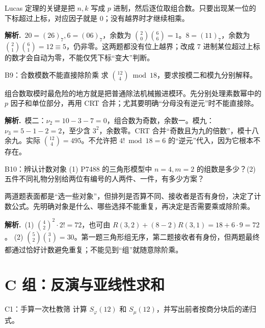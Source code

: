 \documentclass[UTF8,a4paper,11pt,twoside,openright,fontset=fandol]{ctexbook}
\theoremstyle{definition}
\newcommand{\sol}{\par\noindent\textbf{解析.}\ }
\begin{document}
\begin{pitfall}[讲解：先看这题到底在做什么]
Lucas 定理的关键是把 $n,k$ 写成 $p$ 进制，然后逐位取组合数。只要出现某一位的下标超过上标，对应因子就是 $0$；没有越界时才继续相乘。
\end{pitfall}

\sol $20=(26)_7,6=(06)_7$，余数为 $\binom20\binom66=1$。$8=(11)_7$，余数为 $\binom21\binom61=12\equiv5$，仍非零。这两题都没有位上越界；改成 $7$ 进制某位超过上标的数才会自动为零，不能仅凭下标“变大”判断。


\begin{problem}{B9：合数模数不能直接除阶乘}
求 $\binom{12}{4}\bmod18$，要求按模二和模九分别解释。
\end{problem}

\begin{pitfall}[讲解：先看这题到底在做什么]
组合数取模时最危险的地方就是把普通除法机械搬进模环。先分别处理素数幂中的 $p$ 因子和单位部分，再用 CRT 合并；尤其要明确“分母没有逆元”时不能直接除。
\end{pitfall}

\sol 模二：$\nu_2=10-3-7=0$，组合数为奇数，余数一。模九：$\nu_3=5-1-2=2$，至少含 $3^2$，余数零。CRT 合并“奇数且为九的倍数”，模十八余九。实际 $\binom{12}{4}=495$。不允许把 $4!\bmod18=6$ 的“逆元”代入，因为它根本不存在。


\begin{problem}{B10：辨认计数对象}
(1) P7488 的三角形模型中 $n=4,m=2$ 的组数是多少？(2) 五件不同礼物分别给两位有编号的人两件、一件，有多少方案？
\end{problem}

\begin{pitfall}[讲解：先看这题到底在做什么]
两道题表面都是“选一些对象”，但排列是否算不同、接收者是否有身份，决定了计数公式。先明确对象是什么、哪些选择不能重复，再决定是否需要乘或除阶乘。
\end{pitfall}

\sol (1) $\binom42^2\cdot2!=72$，也可由 $R(3,2)+(8-2)R(3,1)=18+6\cdot9=72$。 (2) $\binom52\binom31=30$。第一题三角形组无序，第二题接收者有身份，但两题最终都通过恰好计数避免重复；不能见到“组”就随意除阶乘。


\section{C 组：反演与亚线性求和}
\begin{problem}{C1：手算一次杜教筛}
计算 $S_\varphi(12)$ 和 $S_\mu(12)$，并写出前者按商分块后的递归式。
\end{problem}
\end{document}
